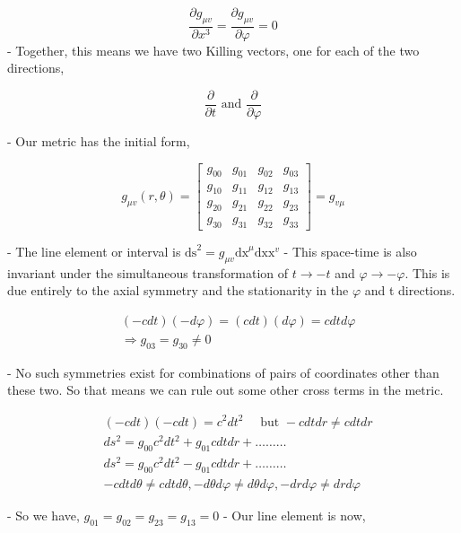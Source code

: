 $$
    \frac{\partial g_{\mu v}}{\partial x^3}=\frac{\partial g_{\mu v}}{\partial \varphi}=0
$$
- Together, this means we have two Killing vectors, one for each of the two directions,

$$
    \frac{\partial}{\partial t} \text { and } \frac{\partial}{\partial \varphi}
$$

- Our metric has the initial form,

$$
    g_{\mu v}(r, \theta)=\left[\begin{array}{llll}
            g_{00} & g_{01} & g_{02} & g_{03} \\
            g_{10} & g_{11} & g_{12} & g_{13} \\
            g_{20} & g_{21} & g_{22} & g_{23} \\
            g_{30} & g_{31} & g_{32} & g_{33}
        \end{array}\right]=g_{v \mu}
$$

- The line element or interval is $\mathrm{ds}^2=g_{\mu v} \mathrm{dx}^\mu \mathrm{dx} \mathrm{x}^v$
- This space-time is also invariant under the simultaneous transformation of $t \rightarrow-t$ and $\varphi \rightarrow-\varphi$. This is due entirely to the axial symmetry and the stationarity in the $\varphi$ and t directions.


\begin{align}
     & (-c d t)(-d \varphi)=(c d t)(d \varphi)=c d t d \varphi \\
     & \Rightarrow g_{03}=g_{30} \neq 0
\end{align}


- No such symmetries exist for combinations of pairs of coordinates other than these two. So that means we can rule out some other cross terms in the metric.


\begin{align}
     & (-c d t)(-c d t)=c^2 d t^2 \quad \text { but }-c d t d r \neq c d t d r                                           \\
     & d s^2=g_{00} c^2 d t^2+g_{01} c d t d r+\ldots \ldots \ldots                                                      \\
     & d s^2=g_{00} c^2 d t^2-g_{01} c d t d r+\ldots \ldots \ldots                                                      \\
     & -c d t d \theta \neq c d t d \theta,-d \theta d \varphi \neq d \theta d \varphi,-d r d \varphi \neq d r d \varphi
\end{align}


- So we have, $g_{01}=g_{02}=g_{23}=g_{13}=0$
- Our line element is now,


